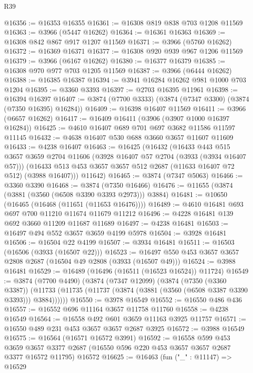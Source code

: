 \begin{lexlean}{R39}
\begin{coremodule}
@16356 := @16353 @16355
@16361 := @16308 @819 @838 @703 @1208 @11569
@16363 := @3966 (@5447 @16262)
@16364 := @16361 @16363
@16369 := @16308 @842 @867 @917 @1207 @11569
@16371 := @3966 (@5760 @16262)
@16372 := @16369 @16371
@16377 := @16308 @920 @939 @967 @1206 @11569
@16379 := @3966 (@6167 @16262)
@16380 := @16377 @16379
@16385 := @16308 @970 @977 @703 @1205 @11569
@16387 := @3966 (@6444 @16262)
@16388 := @16385 @16387
@16394 := @3941 @16284 @16262 @981 @1000 @703 @1204
@16395 := @3360 @3393
@16397 := @2703 @16395 @11961
@16398 := @16394 @16397
@16407 := @3874 (@7700 @3333) (@3874 (@7347 @3300) (@3874 (@7350 @16395) @16284))
@16409 := @16398 @16407 @11569
@16411 := @3966 (@6657 @16262)
@16417 := @16409 @16411 (@3906 (@3907 @1000 @16397 @16284))
@16425 := @4610 @16407 @689 @701 @697 @3682 @11586 @11597 @11145
@16432 := @4638 @16407 @530 @688 @3660 @3657 @11607 @11609
@16433 := @4238 @16407
@16463 := @16425
    (@16432
      (@16433
        @443
        @515
        @3657
        @3659
        @2704
        @11606
        (@3928 @16407 @57 @2704 (@3933 (@3934 @16407 @57)))
        (@16433 @513 @453 @3657 @3657 @512 @2687 (@11633 @16407 @72 @512) (@3988 @16407)))
      @11642)
@16465 := @3874 (@7347 @5063)
@16466 := @3360 @3390
@16468 := @3874 (@7350 @16466)
@16476 := @11655 (@3874 (@3881 (@3560 (@6508 @3390 @3393 @2973))) @3884)
@16481 := @10650 (@16465 (@16468 (@11651 (@11653 @16476))))
@16489 := @4610 @16481 @693 @697 @700 @11210 @11674 @11679 @11212
@16496 := @4228 @16481 @139 @692 @3660 @11209 @11687 @11689
@16497 := @4238 @16481
@16503 := @16497 @494 @552 @3657 @3659 @4199 @5978
@16504 := @3928 @16481
@16506 := @16504 @22 @4199
@16507 := @3934 @16481
@16511 := @16503 (@16506 (@3933 (@16507 @22)))
@16523 := @16497 @550 @453 @3657 @3657 @2808 @2687 (@16504 @49 @2808 (@3933 (@16507 @49)))
@16524 := @3988 @16481
@16529 := @16489 (@16496 (@16511 (@16523 @16524)) @11724)
@16549 := @3874
    (@7700 @4490)
    (@3874
      (@7347 @12099)
      (@3874
        (@7350 (@3360 @3387))
        (@11733 (@11735 (@11737 (@3874 (@3881 (@3560 (@6508 @3387 @3390 @3393))) @3884))))))
@16550 := @3978 @16549
@16552 := @16550 @486 @436
@16557 := @16552 @696 @11164 @3657 @11758 @11760
@16558 := @4238 @16549
@16564 := @16558 @492 @601 @3659 @11163 @3925 @11757
@16571 := @16550 @489 @231 @453 @3657 @3657 @2687 @3925
@16572 := @3988 @16549
@16575 := @16564 (@16571 @16572 @3991)
@16592 := @16558
    @599
    @453
    @3659
    @3657
    @3377
    @2687
    (@16550 @596 @220 @453 @3657 @3657 @2687 @3377 @16572 @11795)
    @16572
@16625 := @16463
    (fun ("_" : @11147) =>
    @16529

\end{coremodule}
\end{lexlean}

